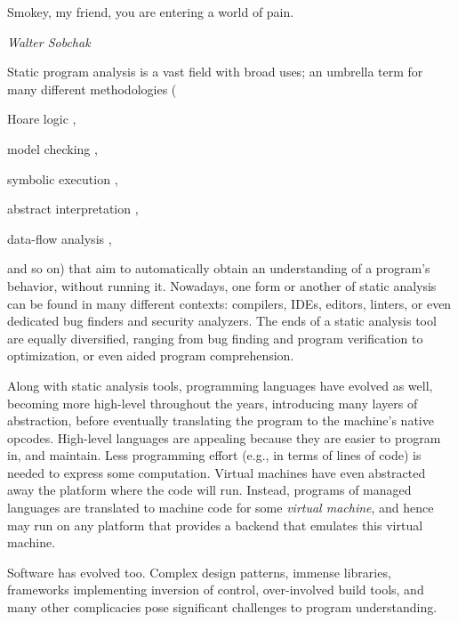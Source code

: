 \label{chapter:intro}

\epigraph{Smokey, my friend, you are entering a world of
  pain.}{\textit{Walter Sobchak}}

Static program analysis is a vast field with broad uses; an umbrella
term for many different methodologies (%
\begin{inparablank}
  \item Hoare logic
    \cite{journals/cacm/Hoare69,floyd1967assigning,lics:2002/Reynolds,csl/OHearnRY01},
  \item model checking
    \cite{icalp/EmersonC80,lop/ClarkeE81,toplas/ClarkeES86,programm/QueilleS82},
  \item symbolic execution
    \cite{journals/cacm/King76,journals/tse/Howden77,conf/kbse/PasareanuR10,Boyer:1975:SFS:390016.808445},
  \item abstract interpretation
    \cite{popl/CousotC77,journals/jlp/CousotC92,journals/logcom/CousotC92},
  \item data-flow analysis
    \cite{popl/Kildall73,books/daglib/0030999,books/mk/Muchnick1997,journals/acta/KamU77,popl/RepsHS95,books/ph/SharirP81},
\end{inparablank}
and so on) that aim to automatically obtain an
understanding of a program's behavior, without running it. Nowadays,
one form or another of static analysis can be found in many different
contexts: compilers, IDEs, editors, linters, or even dedicated bug
finders and security analyzers. The ends of a static analysis tool are
equally diversified, ranging from bug finding and program
verification to optimization, or even aided program comprehension.

Along with static analysis tools, programming languages have
evolved as well, becoming more high-level throughout the years,
introducing many layers of abstraction, before eventually translating
the program to the machine's native opcodes. High-level languages are
appealing because they are easier to program in, and maintain. Less
programming effort (e.g., in terms of lines of code) is needed to
express some computation. Virtual machines have even abstracted away
the platform where the code will run. Instead, programs of managed
languages are translated to machine code for some \emph{virtual
  machine}, and hence may run on any platform that provides a backend
that emulates this virtual machine.

Software has evolved too. Complex design patterns, immense libraries,
frameworks implementing inversion of control, over-involved build
tools, and many other complicacies pose significant challenges to
program understanding.

